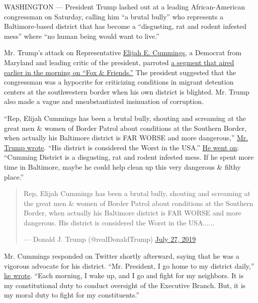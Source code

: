 WASHINGTON --- President Trump lashed out at a leading African-American
congressman on Saturday, calling him ``a brutal bully'' who represents a
Baltimore-based district that has become a ``disgusting, rat and rodent
infested mess'' where ``no human being would want to live.''

Mr. Trump's attack on Representative
\href{https://www.nytimes3xbfgragh.onion/2019/10/17/us/politics/elijah-cummings-dead.html}{Elijah
E. Cummings}, a Democrat from Maryland and leading critic of the
president, parroted
\href{https://video.foxnews.com/v/6064589298001/\#sp=show-clips}{a
segment that aired earlier in the morning on ``Fox \& Friends.''} The
president suggested that the congressman was a hypocrite for criticizing
conditions in migrant detention centers at the southwestern border when
his own district is blighted. Mr. Trump also made a vague and
unsubstantiated insinuation of corruption.

``Rep, Elijah Cummings has been a brutal bully, shouting and screaming
at the great men \& women of Border Patrol about conditions at the
Southern Border, when actually his Baltimore district is FAR WORSE and
more dangerous,''
\href{https://twitter.com/realDonaldTrump/status/1155073964634517505}{Mr.
Trump wrote}. ``His district is considered the Worst in the USA.''
\href{https://twitter.com/realDonaldTrump/status/1155073965880172544}{He
went on}: ``Cumming District is a disgusting, rat and rodent infested
mess. If he spent more time in Baltimore, maybe he could help clean up
this very dangerous \& filthy place.''

\begin{quote}
Rep, Elijah Cummings has been a brutal bully, shouting and screaming at
the great men \& women of Border Patrol about conditions at the Southern
Border, when actually his Baltimore district is FAR WORSE and more
dangerous. His district is considered the Worst in the USA......

--- Donald J. Trump (@realDonaldTrump)
\href{https://twitter.com/realDonaldTrump/status/1155073964634517505?ref_src=twsrc\%5Etfw}{July
27, 2019}
\end{quote}

Mr. Cummings responded on Twitter shortly afterward, saying that he was
a vigorous advocate for his district. ``Mr. President, I go home to my
district daily,''
\href{https://twitter.com/RepCummings/status/1155132215208161281}{he
wrote}. ``Each morning, I wake up, and I go and fight for my neighbors.
It is my constitutional duty to conduct oversight of the Executive
Branch. But, it is my moral duty to fight for my constituents.''

